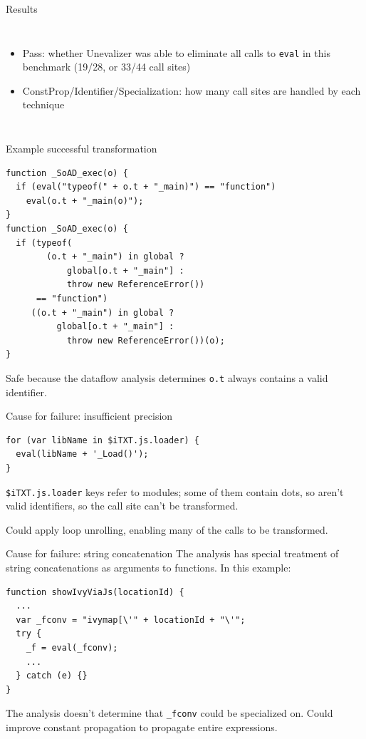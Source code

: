\documentclass{beamer}
\begin{document}
\begin{frame}{Results}
\begin{columns}[l]
\column{3in}
\begin{itemize}
\item Pass: whether Unevalizer was able to eliminate all calls to
{\tt eval} in this benchmark (19/28, or 33/44 call sites)
\item ConstProp/Identifier/Specialization: how many call sites are handled
by each technique
\end{itemize}
\end{columns}
\end{frame}

\begin{frame}[fragile]{Example successful transformation}
\begin{verbatim}
function _SoAD_exec(o) {
  if (eval("typeof(" + o.t + "_main)") == "function")
    eval(o.t + "_main(o)");
}
function _SoAD_exec(o) {
  if (typeof(
        (o.t + "_main") in global ?
            global[o.t + "_main"] :
            throw new ReferenceError())
      == "function")
     ((o.t + "_main") in global ?
          global[o.t + "_main"] :
            throw new ReferenceError())(o);
}
\end{verbatim}
Safe because the dataflow analysis determines {\tt o.t} always contains
a valid identifier.
\end{frame}

\begin{frame}[fragile]{Cause for failure: insufficient precision}
\begin{verbatim}
for (var libName in $iTXT.js.loader) {
  eval(libName + '_Load()');
}
\end{verbatim}
\vspace{5mm}
{\tt \$iTXT.js.loader} keys refer to modules; some of them contain dots, 
so aren't valid identifiers, so the call site can't be transformed.

\vspace{5mm}
Could apply loop unrolling, enabling many of the calls to be transformed.
\end{frame}

\begin{frame}[fragile]{Cause for failure: string concatenation}
The analysis has special treatment of string concatenations as arguments
to functions. In this example:

\begin{verbatim}
function showIvyViaJs(locationId) {
  ...
  var _fconv = "ivymap[\'" + locationId + "\'";
  try {
    _f = eval(_fconv);
    ...
  } catch (e) {}
}
\end{verbatim}
\vspace{5mm}
The analysis doesn't determine that {\tt \_fconv} could be specialized on.
Could improve constant propagation to propagate entire expressions.
\end{frame}
\end{document}

